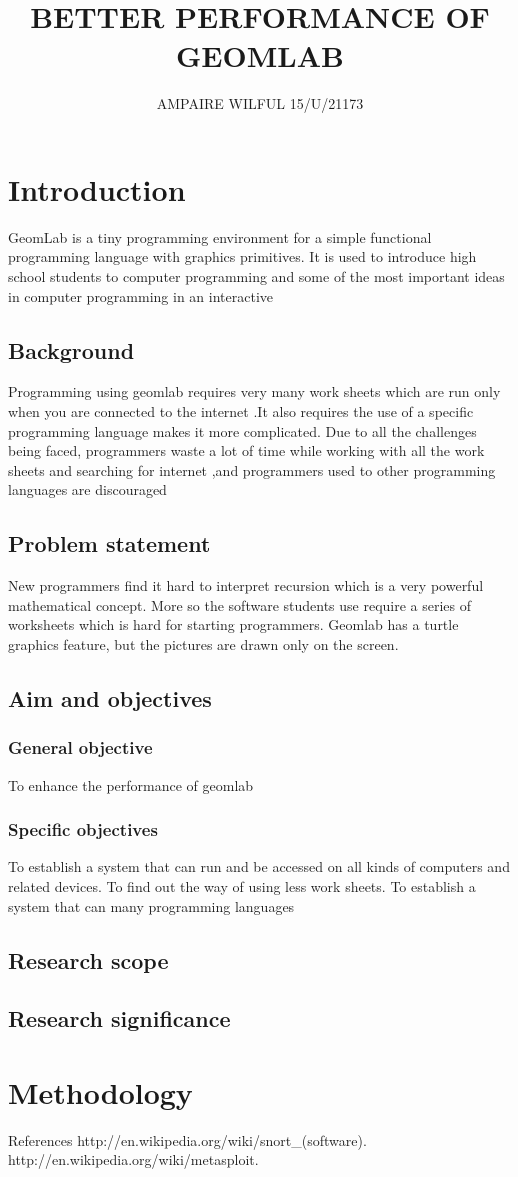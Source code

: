 \documentclass {article}
\begin{document}
\title {BETTER PERFORMANCE OF GEOMLAB}
\author {AMPAIRE WILFUL 15/U/21173}
\maketitle
\section {Introduction}
GeomLab is a tiny programming environment for a simple functional programming language with graphics primitives.
 It is used to introduce high school students to computer programming and some of the most important ideas in computer programming in an interactive
\subsection {Background }
Programming using geomlab requires very many work sheets which are run only when you are connected to the internet .It also requires the use of a specific programming language makes it more complicated. Due to all the challenges being faced, programmers waste a lot of time while working with all the work sheets and searching for internet ,and programmers used to other programming languages are discouraged        


\subsection {Problem statement}
New programmers find it hard to interpret recursion which is a very powerful mathematical concept. More so the software students use require a series of worksheets which is hard for starting programmers. Geomlab has a turtle graphics feature, but the pictures are drawn only on the screen.
\subsection{ Aim and objectives}
\subsubsection{ General objective}
To enhance the performance of geomlab
 \subsubsection {Specific objectives}
To establish a system that can run and be accessed on all kinds of computers and related devices.
\newline To find out the way of using less work sheets.
\newline To establish a system that can many programming languages

\subsection {Research scope}
\subsection {Research significance}
\section{ Methodology}
{ References}
 http://en.wikipedia.org/wiki/snort_(software).
 \newline http://en.wikipedia.org/wiki/metasploit.
\end{document}

